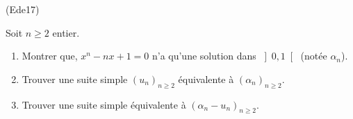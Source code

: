 \begin{tiny}(Ede17)\end{tiny} Soit $n \geq 2$ entier. 
\begin{enumerate}
  \item Montrer que, $x^{n} - nx + 1 = 0$ n'a qu'une solution dans $\left] 0, 1\right[$ (notée $\alpha _{n}$).
  \item Trouver une suite simple $(u _{n})_{n\geq 2}$ équivalente à $(\alpha _{n})_{n\geq 2}$.
  \item Trouver une suite simple équivalente à $(\alpha _{n} - u_n)_{n\geq 2}$.
\end{enumerate}
